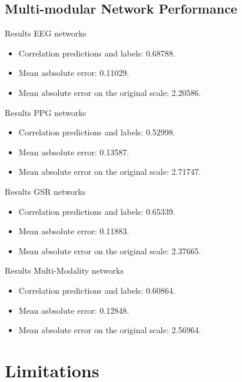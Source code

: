 \documentclass[12pt]{article}
\begin{document}
\subsection{Multi-modular Network Performance}


Results EEG networks 
\begin{itemize}
\item Correlation predictions and labels: 0.68788.
\item Mean asbsolute error: 0.11029.
\item Mean absolute error on the original scale: 2.20586.
\end{itemize}
\bigskip

Results PPG networks 
\begin{itemize}
\item Correlation predictions and labels: 0.52998.
\item Mean asbsolute error: 0.13587.
\item Mean absolute error on the original scale: 2.71747.
\end{itemize}
\bigskip

Results GSR networks 
\begin{itemize}
\item Correlation predictions and labels: 0.65339.
\item Mean asbsolute error: 0.11883.
\item Mean absolute error on the original scale: 2.37665.
\end{itemize}
\bigskip

Results Multi-Modality networks 
\begin{itemize}
\item Correlation predictions and labels: 0.60864.
\item Mean asbsolute error: 0.12848.
\item Mean absolute error on the original scale: 2.56964.
\end{itemize}



\section{Limitations}
\end{document}
